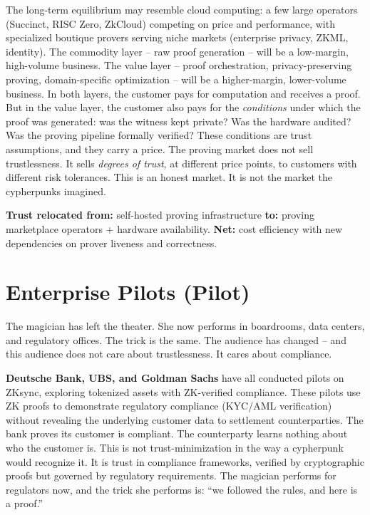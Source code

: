 \documentclass[
  11pt,
  openany]{report}
\renewcommand{\textbf}[1]{{\bfseries\color{MidnightBold}#1}}
\begin{document}
The long-term equilibrium may resemble cloud computing: a few large operators
(Succinct, RISC Zero, ZkCloud) competing on price and performance, with
specialized boutique provers serving niche markets (enterprise privacy, ZKML,
identity). The commodity layer -- raw proof generation -- will be a low-margin,
high-volume business. The value layer -- proof orchestration, privacy-preserving
proving, domain-specific optimization -- will be a higher-margin, lower-volume
business. In both layers, the customer pays for computation and receives a
proof. But in the value layer, the customer also pays for the \emph{conditions}
under which the proof was generated: was the witness kept private? Was the
hardware audited? Was the proving pipeline formally verified? These conditions
are trust assumptions, and they carry a price. The proving market does not sell
trustlessness. It sells \emph{degrees of trust}, at different price points, to
customers with different risk tolerances. This is an honest market. It is not
the market the cypherpunks imagined.

\textbf{Trust relocated from:} self-hosted proving infrastructure \textbf{to:}
proving marketplace operators + hardware availability. \textbf{Net:} cost
efficiency with new dependencies on prover liveness and correctness.

\section{Enterprise Pilots (Pilot)}\label{enterprise-pilots-pilot}

The magician has left the theater. She now performs in boardrooms, data centers,
and regulatory offices. The trick is the same. The audience has changed -- and
this audience does not care about trustlessness. It cares about compliance.

\textbf{Deutsche Bank, UBS, and Goldman Sachs} have all conducted pilots on
ZKsync, exploring tokenized assets with ZK-verified compliance. These pilots use
ZK proofs to demonstrate regulatory compliance (KYC/AML verification) without
revealing the underlying customer data to settlement counterparties. The bank
proves its customer is compliant. The counterparty learns nothing about who the
customer is. This is not trust-minimization in the way a cypherpunk would
recognize it. It is trust in compliance frameworks, verified by cryptographic
proofs but governed by regulatory requirements. The magician performs for
regulators now, and the trick she performs is: ``we followed the rules, and here
is a proof.''
\end{document}
